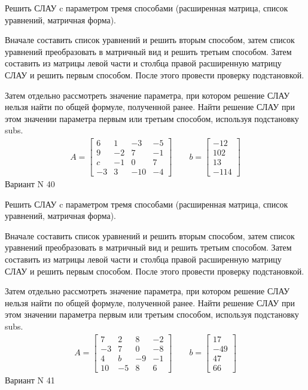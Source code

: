 \documentclass[11pt]{report}
\begin{document}
Решить СЛАУ c параметром тремя способами (расширенная матрица, список уравнений, матричная форма).

Вначале составить список уравнений и решить вторым способом,
затем список уравнений преобразовать в матричный вид и решить третьим способом.
Затем составить из матрицы левой части и столбца правой расширенную матрицу СЛАУ и решить первым способом.
После этого провести проверку подстановкой.

Затем отдельно рассмотреть значение параметра, при котором решение СЛАУ нельзя найти по общей формуле,
полученной ранее.
Найти решение СЛАУ при этом значении параметра первым или третьим способом, используя подстановку subs.
\begin{align*}
    A = \left[\begin{matrix}6 & 1 & -3 & -5\\9 & -2 & 7 & -1\\c & -1 & 0 & 7\\-3 & 3 & -10 & -4\end{matrix}\right]
\qquad b = \left[\begin{matrix}-12\\102\\13\\-114\end{matrix}\right]
\end{align*}
\newpage
Вариант N 40


Решить СЛАУ c параметром тремя способами (расширенная матрица, список уравнений, матричная форма).

Вначале составить список уравнений и решить вторым способом,
затем список уравнений преобразовать в матричный вид и решить третьим способом.
Затем составить из матрицы левой части и столбца правой расширенную матрицу СЛАУ и решить первым способом.
После этого провести проверку подстановкой.

Затем отдельно рассмотреть значение параметра, при котором решение СЛАУ нельзя найти по общей формуле,
полученной ранее.
Найти решение СЛАУ при этом значении параметра первым или третьим способом, используя подстановку subs.
\begin{align*}
    A = \left[\begin{matrix}7 & 2 & 8 & -2\\-3 & 7 & 0 & -8\\4 & b & -9 & -1\\10 & -5 & 8 & 6\end{matrix}\right]
\qquad b = \left[\begin{matrix}17\\-49\\47\\66\end{matrix}\right]
\end{align*}
\newpage
Вариант N 41
\end{document}
